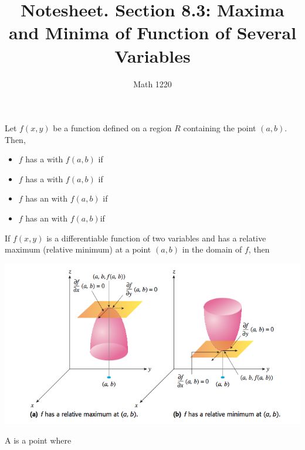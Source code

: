 \documentclass[12pt, a4paper]{article}
\author{Math 1220}
\title{Notesheet. Section 8.3: Maxima and Minima of Function of
  Several Variables}
\date{}
\begin{document}
\maketitle
\nameline
\vspace{-0.3in}
\begin{defi}
  Let \(f(x,y)\) be a function defined on a region \(R\) containing
  the point \((a,b)\). Then,
  \begin{itemize}
  \item \(f\) has a  with
     \(f(a,b)\) if \\
    
  \item \(f\) has a  with
     \(f(a,b)\) if\\
    
  \item \(f\) has an  with
     \(f(a,b)\) if\\
    
  \item \(f\) has an  with
     \(f(a,b)\)if
  \end{itemize}
\end{defi}
\begin{thrm}
  If \(f(x,y)\) is a differentiable function of two variables and has
  a relative maximum (relative minimum) at a point \((a,b)\) in the
  domain of \(f\), then 
\end{thrm}
\includegraphics[scale=0.5]{images/local-min-max}
\begin{defi}
  A  is a point where 
\end{defi}
\end{document}
